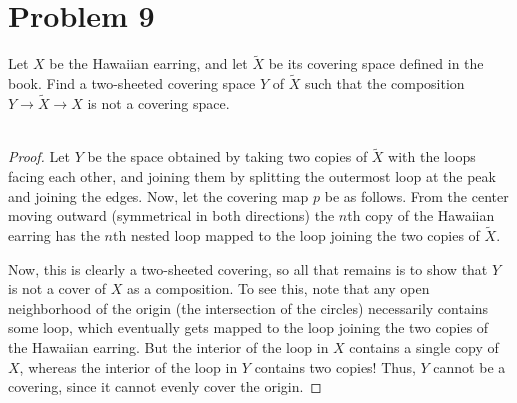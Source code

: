 \documentclass[fontsize=11pt]{scrartcl} %
\numberwithin{equation}{section} %
\numberwithin{figure}{section} %
\numberwithin{table}{section} %
\begin{document}
\section*{Problem 9}
Let $X$ be the Hawaiian earring, and let $\tilde{X}$ be its covering space
defined in the book. Find a two-sheeted covering space $Y$ of $\tilde{X}$ such
that the composition $Y\to \tilde{X}\to X$ is not a covering space.
\\
\\
\begin{proof}
    Let $Y$ be the space obtained by taking two copies of $\tilde{X}$ with the
    loops facing each other, and joining them by splitting the outermost loop at
    the peak and joining the edges. Now, let the covering map $p$ be as follows.
    From the center moving outward (symmetrical in both directions) the $n$th
    copy of the Hawaiian earring has the $n$th nested loop mapped to the loop
    joining the two copies of $\tilde{X}$.

    Now, this is clearly a two-sheeted covering, so all that remains is to show
    that $Y$ is not a cover of $X$ as a composition. To see this, note that any
    open neighborhood of the origin (the intersection of the circles)
    necessarily contains some loop, which eventually gets mapped to the loop
    joining the two copies of the Hawaiian earring. But the interior of the loop
    in $X$ contains a single copy of $X$, whereas the interior of the loop in
    $Y$ contains two copies! Thus, $Y$ cannot be a covering, since it cannot
    evenly cover the origin.
\end{proof}
\end{document}
